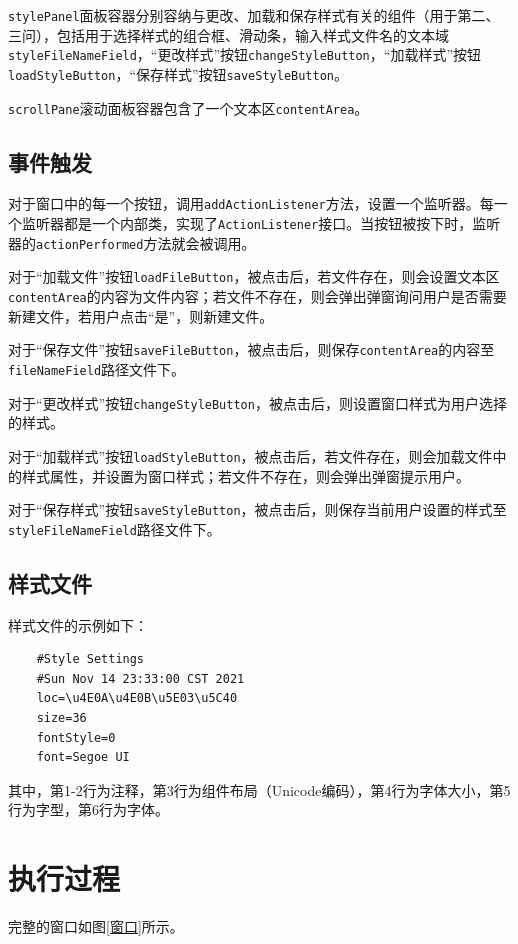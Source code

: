 \documentclass[11pt]{homework}
\begin{document}
  \verb|stylePanel|面板容器分别容纳与更改、加载和保存样式有关的组件（用于第二、三问），包括用于选择样式的组合框、滑动条，输入样式文件名的文本域\verb|styleFileNameField|，“更改样式”按钮\verb|changeStyleButton|，“加载样式”按钮\verb|loadStyleButton|，“保存样式”按钮\verb|saveStyleButton|。

  \verb|scrollPane|滚动面板容器包含了一个文本区\verb|contentArea|。

  \subsection*{事件触发}
  对于窗口中的每一个按钮，调用\verb|addActionListener|方法，设置一个监听器。每一个监听器都是一个内部类，实现了\verb|ActionListener|接口。当按钮被按下时，监听器的\verb|actionPerformed|方法就会被调用。

  对于“加载文件”按钮\verb|loadFileButton|，被点击后，若文件存在，则会设置文本区\verb|contentArea|的内容为文件内容；若文件不存在，则会弹出弹窗询问用户是否需要新建文件，若用户点击“是”，则新建文件。

  对于“保存文件”按钮\verb|saveFileButton|，被点击后，则保存\verb|contentArea|的内容至\verb|fileNameField|路径文件下。

  对于“更改样式”按钮\verb|changeStyleButton|，被点击后，则设置窗口样式为用户选择的样式。

  对于“加载样式”按钮\verb|loadStyleButton|，被点击后，若文件存在，则会加载文件中的样式属性，并设置为窗口样式；若文件不存在，则会弹出弹窗提示用户。

  对于“保存样式”按钮\verb|saveStyleButton|，被点击后，则保存当前用户设置的样式至\verb|styleFileNameField|路径文件下。

  \subsection*{样式文件}
  样式文件的示例如下：
  \begin{lstlisting}
    #Style Settings
    #Sun Nov 14 23:33:00 CST 2021
    loc=\u4E0A\u4E0B\u5E03\u5C40
    size=36
    fontStyle=0
    font=Segoe UI
  \end{lstlisting}

  其中，第1-2行为注释，第3行为组件布局（Unicode编码），第4行为字体大小，第5行为字型，第6行为字体。

\section*{执行过程}

  完整的窗口如图\ref{窗口}所示。
\end{document}
